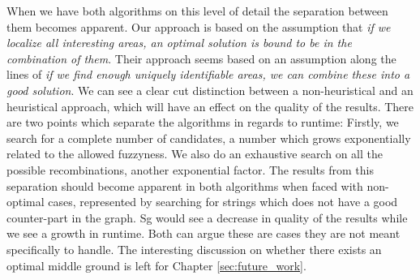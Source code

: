 \documentclass[thesis.tex]{subfiles}
\begin{document}
\par\noindent
When we have both algorithms on this level of detail the separation between them becomes apparent. Our approach is based on the assumption that \textit{if we localize all interesting areas, an optimal solution is bound to be in the combination of them}. Their approach seems based on an assumption along the lines of \textit{if we find enough uniquely identifiable areas, we can combine these into a good solution}. We can see a clear cut distinction between a non-heuristical and an heuristical approach, which will have an effect on the quality of the results. There are two points which separate the algorithms in regards to runtime: Firstly, we search for a complete number of candidates, a number which grows exponentially related to the allowed fuzzyness. We also do an exhaustive search on all the possible recombinations, another exponential factor. The results from this separation should become apparent in both algorithms when faced with non-optimal cases, represented by searching for strings which does not have a good counter-part in the graph. Sg would see a decrease in quality of the results while we see a growth in runtime. Both can argue these are cases they are not meant specifically to handle. The interesting discussion on whether there exists an optimal middle ground is left for Chapter \ref{sec:future_work}.
\end{document}
